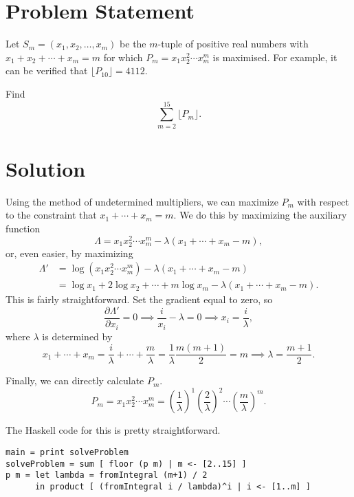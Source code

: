 \documentclass{article}
\newcommand{\pp}[2]{\frac{\partial #1}{\partial #2}}
\begin{document}
\section*{Problem Statement}
Let $S_m = (x_1, x_2, \ldots, x_m)$ be the $m$-tuple of positive real numbers
with $x_1 + x_2 + \cdots + x_m = m$ for which $P_m = x_1 x_2^2 \cdots x_m^m$ is
maximised. For example, it can be verified that $\lfloor P_{10} \rfloor = 4112$.

Find \[ \sum_{m=2}^{15} \lfloor P_m \rfloor. \]

\section*{Solution}
Using the method of undetermined multipliers, we can maximize $P_m$ with
respect to the constraint that $x_1 + \cdots + x_m = m$. We do this by
maximizing the auxiliary function
\[ \Lambda = x_1x_2^2\cdots x_m^m - \lambda (x_1 + \cdots + x_m - m), \]
or, even easier, by maximizing
\begin{align*}
\Lambda' &= \log(x_1x_2^2\cdots x_m^m) - \lambda (x_1 + \cdots + x_m - m) \\
         &= \log x_1 + 2\log x_2 + \cdots + m\log x_m - \lambda (x_1+\cdots+x_m-m).
\end{align*}
This is fairly straightforward. Set the gradient equal to zero, so
\[ \pp{\Lambda'}{x_i} = 0 \implies \frac{i}{x_i} - \lambda = 0 \implies x_i = \frac{i}{\lambda}, \]
where $\lambda$ is determined by
\[ x_1 + \cdots + x_m = \frac{i}{\lambda} + \cdots + \frac{m}{\lambda} = \frac{1}{\lambda}\frac{m(m+1)}{2} = m \implies \lambda = \frac{m+1}{2}. \]

Finally, we can directly calculate $P_m$.
\[ P_m = x_1 x_2^2 \cdots x_m^m = \left( \frac{1}{\lambda} \right)^1 \left( \frac{2}{\lambda} \right)^2 \cdots  \left( \frac{m}{\lambda} \right)^m. \]

The Haskell code for this is pretty straightforward.
\begin{verbatim}
main = print solveProblem
solveProblem = sum [ floor (p m) | m <- [2..15] ]
p m = let lambda = fromIntegral (m+1) / 2
      in product [ (fromIntegral i / lambda)^i | i <- [1..m] ]
\end{verbatim}
\end{document}
